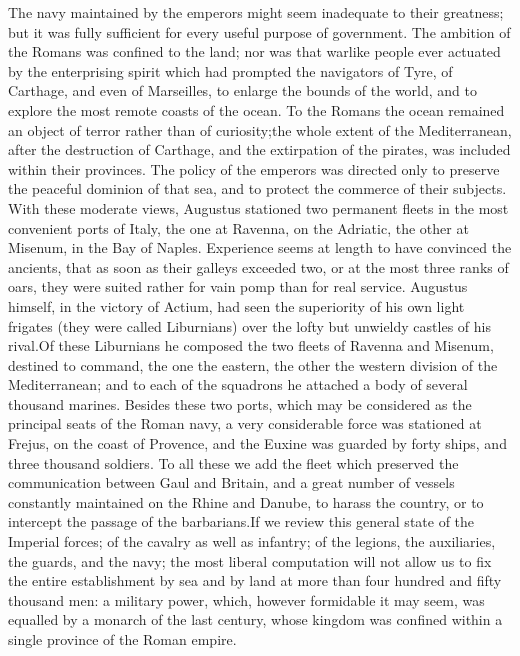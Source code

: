 
The navy maintained by the emperors might seem inadequate to
their greatness; but it was fully sufficient for every useful
purpose of government. The ambition of the Romans was confined to
the land; nor was that warlike people ever actuated by the
enterprising spirit which had prompted the navigators of Tyre, of
Carthage, and even of Marseilles, to enlarge the bounds of the
world, and to explore the most remote coasts of the ocean. To the
Romans the ocean remained an object of terror rather than of
curiosity;\footnotemark[66] the whole extent of the Mediterranean, after the
destruction of Carthage, and the extirpation of the pirates, was
included within their provinces. The policy of the emperors was
directed only to preserve the peaceful dominion of that sea, and
to protect the commerce of their subjects. With these moderate
views, Augustus stationed two permanent fleets in the most
convenient ports of Italy, the one at Ravenna, on the Adriatic,
the other at Misenum, in the Bay of Naples. Experience seems at
length to have convinced the ancients, that as soon as their
galleys exceeded two, or at the most three ranks of oars, they
were suited rather for vain pomp than for real service. Augustus
himself, in the victory of Actium, had seen the superiority of
his own light frigates (they were called Liburnians) over the
lofty but unwieldy castles of his rival.\footnotemark[67] Of these Liburnians
he composed the two fleets of Ravenna and Misenum, destined to
command, the one the eastern, the other the western division of
the Mediterranean; and to each of the squadrons he attached a
body of several thousand marines. Besides these two ports, which
may be considered as the principal seats of the Roman navy, a
very considerable force was stationed at Frejus, on the coast of
Provence, and the Euxine was guarded by forty ships, and three
thousand soldiers. To all these we add the fleet which preserved
the communication between Gaul and Britain, and a great number of
vessels constantly maintained on the Rhine and Danube, to harass
the country, or to intercept the passage of the barbarians.\footnotemark[68] If
we review this general state of the Imperial forces; of the
cavalry as well as infantry; of the legions, the auxiliaries, the
guards, and the navy; the most liberal computation will not allow
us to fix the entire establishment by sea and by land at more
than four hundred and fifty thousand men: a military power,
which, however formidable it may seem, was equalled by a monarch
of the last century, whose kingdom was confined within a single
province of the Roman empire.\footnotemark[69]

